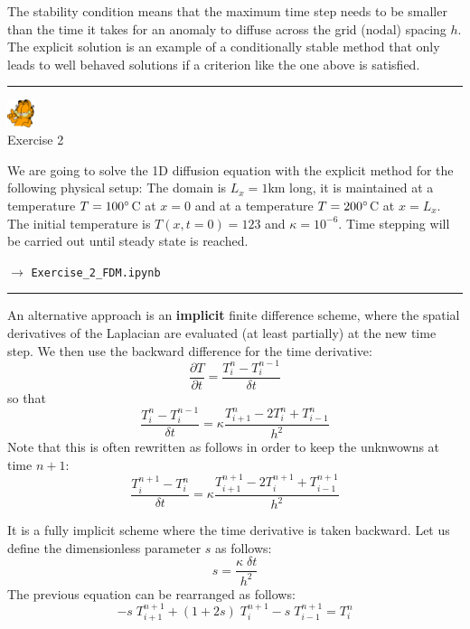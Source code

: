 The stability condition means that the maximum time step needs to be smaller than the time it
takes for an anomaly to diffuse across the grid (nodal) spacing $h$.
The explicit solution is an example of a {\color{olive} conditionally stable method}
that only leads to well behaved solutions if a criterion like the one above is satisfied.

\begin{center}
\begin{minipage}[t]{0.77\textwidth}
\par\noindent\rule{\textwidth}{0.4pt}

\begin{center}
\includegraphics[width=0.8cm]{images/garftr} \\
{\color{orange}Exercise 2}
\end{center}

We are going to solve the 1D diffusion equation with the explicit method
for the following physical setup: The domain is $L_x=1$km long, 
it is maintained at a temperature $T=100\degree$C at $x=0$ and at a temperature
$T=200\degree$C at $x=L_x$. The initial temperature is $T(x,t=0)=123$
and $\kappa=10^{-6}$. 
Time stepping will be carried out until steady state is reached.


$\rightarrow$ {\tt Exercise\_2\_FDM.ipynb}

\par\noindent\rule{\textwidth}{0.4pt}
\end{minipage}
\end{center}

\noindent An alternative approach is an {\bf implicit} finite difference scheme, where the spatial derivatives
of the Laplacian are evaluated (at least partially) at the new time step.
We then use the backward difference for the time derivative:
\[
\frac{\partial T}{\partial t} 
= \frac{T_{i}^{n}-T_i^{n-1}}{\delta t} 
\]
so that
\[
\frac{T_{i}^{n}-T_i^{n-1}}{\delta t} 
= \kappa \frac{T_{i+1}^n - 2T_i^n + T_{i-1}^n}{h^2}
\]
Note that this is often rewritten as follows in order to keep the unknwowns at time $n+1$:
\[
\frac{T_{i}^{n+1}-T_i^{n}}{\delta t} 
= \kappa \frac{T_{i+1}^{n+1} - 2T_i^{n+1} + T_{i-1}^{n+1}}{h^2}
\]

It is a fully implicit scheme where the time derivative is taken backward.
Let us define the dimensionless parameter $s$ as follows:
\[
s=\frac{\kappa \; \delta t}{h^2}
\]
The previous equation can be rearranged as follows:
\[
\boxed{
-s \; T_{i+1}^{n+1} + (1+2s)\; T_{i}^{n+1} - s\; T_{i-1}^{n+1} = T_i^{n}
}
\]

